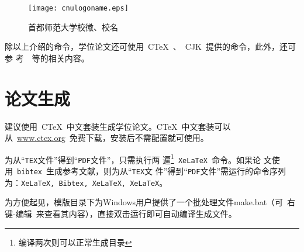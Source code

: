 \vspace{2ex}
\begin{figure}[!h]
\begin{center}
 \texttt{[image: cnulogoname.eps]}
  \caption{首都师范大学校徽、校名}
  \label{fig:logo}
\end{center}
\end{figure}
\vspace{-2ex}

除以上介绍的命令，学位论文还可使用~C\TeX~、~CJK~提供的命令，此外，还可参
考~\cite{TOetiker:lshort, wang:graph, lamport:LaTeX,
DEknuth:TeXbook}~等的相关内容。

\section{论文生成}

建议使用~C\TeX~中文套装生成学位论文。C\TeX~中文套装可以
从~\url{www.ctex.org}~免费下载，安装后不需配置就可使用。

为从``\texttt{TEX}文件''得到``\texttt{PDF}文件''，只需执行两
遍\footnote{编译两次则可以正常生成目录}~\texttt{XeLaTeX}~命令。如果论
文使用~\texttt{bibtex}~生成参考文献，则为从``\texttt{TEX}文
件''得到``\texttt{PDF}文件''需运行的命令序列为：\texttt{XeLaTeX,
Bibtex}\texttt{, XeLaTeX, XeLaTeX}。\par
为方便起见，模版目录下为Windows用户提供了一个批处理文件make.bat（可~右键-编辑~来查看其内容），直接双击运行即可自动编译生成文件。

